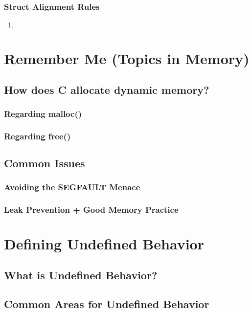 \documentclass[a4paper, 12pt]{article}
\begin{document}
\begin{flushleft}

\end{flushleft}

\subsubsection{Struct Alignment Rules}
\begin{enumerate}
	\item
\end{enumerate}
\newpage

\section{Remember Me (Topics in Memory)}
\label{sec:dynamicmem}
\subsection{How does C allocate dynamic memory?}
\subsubsection{Regarding malloc()}
\subsubsection{Regarding free()}
\subsection{Common Issues}
\subsubsection{Avoiding the SEGFAULT Menace}
\subsubsection{Leak Prevention + Good Memory Practice}

\newpage

\section{Defining Undefined Behavior}
\label{sec:undef}
\subsection{What is Undefined Behavior?}
\subsection{Common Areas for Undefined Behavior}
\end{document}
